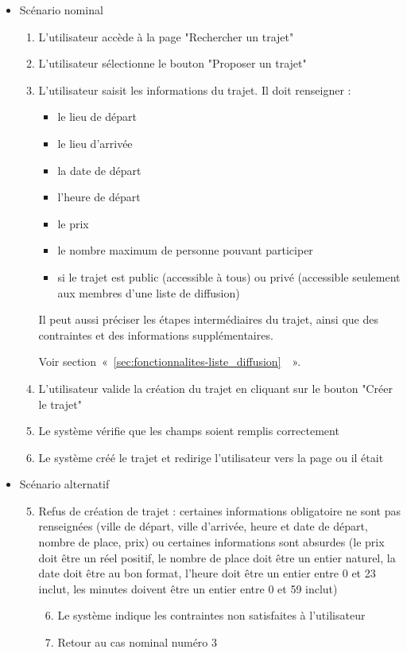 \begin{itemize}
\begin{itemize}
    \item Scénario nominal
    \begin{enumerate}
        \item L'utilisateur accède à la page "Rechercher un trajet"
        \item L'utilisateur sélectionne le bouton "Proposer un trajet"
        \item L'utilisateur saisit les informations du trajet. Il doit renseigner :
        \begin{itemize}
            \item le lieu de départ
            \item le lieu d'arrivée
            \item la date de départ
            \item l'heure de départ
            \item le prix
            \item le nombre maximum de personne pouvant participer
            \item si le trajet est public (accessible à tous) ou privé (accessible seulement aux membres d'une liste de diffusion) 
        \end{itemize} Il peut aussi préciser les étapes intermédiaires du trajet, ainsi que des contraintes et des informations supplémentaires.
        
        Voir section~«~\ref{sec:fonctionnalites-liste_diffusion}~~».
        \item L'utilisateur valide la création du trajet en cliquant sur le bouton "Créer le trajet"
        \item Le système vérifie que les champs soient remplis correctement
        \item Le système créé le trajet et redirige l'utilisateur vers la page ou il était
    \end{enumerate}
    \item Scénario alternatif
      \begin{enumerate}[{1{a}.}]\setcounter{enumi}{4}
             \item Refus de création de trajet : certaines informations obligatoire ne sont pas renseignées (ville de départ, ville d'arrivée, heure et date de départ, nombre de place, prix) ou certaines informations sont absurdes (le prix doit être un réel positif, le nombre de place doit être un entier naturel, la date doit être au bon format, l'heure doit être un entier entre 0 et 23 inclut, les minutes doivent être un entier entre 0 et 59 inclut)
            \begin{enumerate}[{1.}]\setcounter{enumii}{5}
                \item Le système indique les contraintes non satisfaites à l'utilisateur
                \item Retour au cas nominal numéro 3
            \end{enumerate}
        \end{enumerate}
    

\end{itemize}
\end{itemize}
